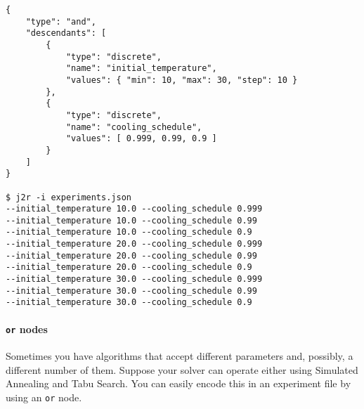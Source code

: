 \documentclass[11pt,notitlepage,twoside,a4paper]{article}
\begin{document}
\begin{footnotesize}
\begin{lstlisting}
{
    "type": "and",
    "descendants": [
        { 
            "type": "discrete", 
            "name": "initial_temperature", 
            "values": { "min": 10, "max": 30, "step": 10 }
        },
        {
            "type": "discrete",
            "name": "cooling_schedule",
            "values": [ 0.999, 0.99, 0.9 ]
        }
    ]
}

$ j2r -i experiments.json
--initial_temperature 10.0 --cooling_schedule 0.999
--initial_temperature 10.0 --cooling_schedule 0.99
--initial_temperature 10.0 --cooling_schedule 0.9
--initial_temperature 20.0 --cooling_schedule 0.999
--initial_temperature 20.0 --cooling_schedule 0.99
--initial_temperature 20.0 --cooling_schedule 0.9
--initial_temperature 30.0 --cooling_schedule 0.999
--initial_temperature 30.0 --cooling_schedule 0.99
--initial_temperature 30.0 --cooling_schedule 0.9
\end{lstlisting}
\end{footnotesize}

\paragraph{\texttt{or} nodes}

Sometimes you have algorithms that accept different parameters and,
possibly, a different number of them. Suppose your solver can operate
either using Simulated Annealing and Tabu Search. You can easily encode
this in an experiment file by using an \texttt{or} node.
\end{document}
